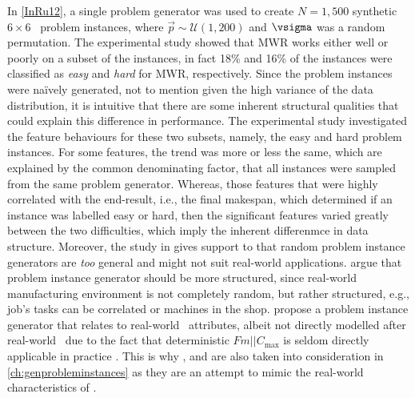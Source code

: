 In \cref{InRu12}, a single problem generator was used to create  $N=1,500$ 
synthetic $6\times6$ \jsp\ problem instances, where 
$\vec{p}\sim\mathcal{U}(1,200)$ and $\vsigma$ was a random permutation. The 
experimental study showed that MWR works either well or poorly on a subset of 
the instances, in fact 18\% and 16\% of the instances were classified as 
\emph{easy} and \emph{hard} for MWR, respectively. 
Since the problem instances were na\"{i}vely generated, not to mention given 
the high variance of the data distribution, it is intuitive that there are some 
inherent structural qualities that could explain this difference in 
performance. The experimental study investigated the feature behaviours for 
these two subsets, namely, the easy and hard problem instances. For some 
features, the trend was more or less the same, which are explained by the 
common denominating factor, that all instances were sampled from the same 
problem generator. Whereas, those features that were highly correlated with the 
end-result, i.e., the final makespan, which determined if an instance was 
labelled easy or hard, then the significant features varied greatly between the 
two difficulties, which imply the inherent differenmce in data structure. 
Moreover, the study in gives support to that random problem instance generators are \emph{too} general and might not suit real-world applications. \citet{Whitley} argue that problem instance generator should be more structured, since real-world manufacturing environment is not completely random, but rather structured, e.g.,  job's tasks can be correlated or machines in the shop. \citeauthor{Whitley} propose a problem instance generator that relates to real-world \fsp\ attributes, albeit not directly modelled after real-world \fsp\ due to the fact that deterministic $Fm||C_{\max}$ is seldom directly applicable in practice \citep{Dudek92}. This is why ,  and  are also taken into consideration in \cref{ch:genprobleminstances} as they are an attempt to mimic the real-world characteristics of \fsp.

